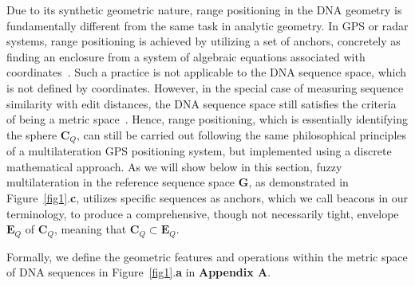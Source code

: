 \documentclass[unnumsec,webpdf,contemporary,large]{oup-authoring-template}%
\theoremstyle{thmstyleone}%
\theoremstyle{thmstyletwo}%
\theoremstyle{thmstylethree}%
\newtheorem{definition}{Definition}
\begin{document}
Due to its synthetic geometric nature, range positioning in the DNA geometry is fundamentally different from the same task in analytic geometry.
In GPS or radar systems, range positioning is achieved by utilizing a set of anchors, concretely as finding an enclosure from a system of algebraic equations associated with coordinates~\citep{malivert2023comparison, zafari2019survey}.
Such a practice is not applicable to the DNA sequence space, which is not defined by coordinates.
However, in the special case of measuring sequence similarity with edit distances, the DNA sequence space still satisfies the criteria of being a metric space~\citep{kulis2013metric}.
Hence, range positioning, which is essentially identifying the sphere $\textbf{C}_Q$, 
can still be carried out following the same philosophical principles of a multilateration GPS positioning system,
but implemented using a discrete mathematical approach.
As we will show below in this section, fuzzy multilateration in the reference sequence space $\textbf{G}$, as demonstrated in Figure~\ref{fig1}.\textbf{c}, utilizes specific sequences as anchors, which we call beacons in our terminology, to produce a comprehensive, though not necessarily tight, envelope $\textbf{E}_Q$ of $\textbf{C}_Q$, meaning that $\textbf{C}_Q \subset \textbf{E}_Q$.

Formally, we define the geometric features and operations within the metric space of DNA sequences in Figure~\ref{fig1}.\textbf{a} in \textbf{Appendix A}.

\end{document}
